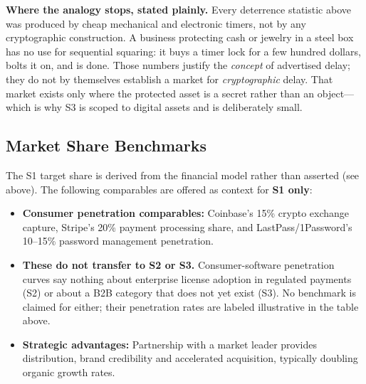 \noindent\textbf{Where the analogy stops, stated plainly.} Every deterrence statistic
above was produced by cheap mechanical and electronic timers, not by any cryptographic
construction. A business protecting cash or jewelry in a steel box has no use for
sequential squaring: it buys a timer lock for a few hundred dollars, bolts it on, and
is done. Those numbers justify the \emph{concept} of advertised delay; they do not by
themselves establish a market for \emph{cryptographic} delay. That market exists only
where the protected asset is a secret rather than an object---which is why S3 is scoped
to digital assets and is deliberately small.

\subsection{Market Share Benchmarks}
The S1 target share is derived from the financial model rather than asserted (see
above). The following comparables are offered as context for \textbf{S1 only}:

\begin{itemize}[nosep]
  \item \textbf{Consumer penetration comparables:} Coinbase's 15\% crypto exchange
    capture\cite{coinbase2021}, Stripe's 20\% payment processing
    share\cite{stripe2023}, and LastPass/1Password's 10--15\% password management
    penetration\cite{lastpass2023}.
  \item \textbf{These do not transfer to S2 or S3.} Consumer-software penetration
    curves say nothing about enterprise license adoption in regulated payments (S2)
    or about a B2B category that does not yet exist (S3). No benchmark is claimed for
    either; their penetration rates are labeled illustrative in the table above.
  \item \textbf{Strategic advantages:} Partnership with a market leader provides
    distribution, brand credibility and accelerated acquisition, typically doubling
    organic growth rates\cite{reforge2022,hagiu2015}.
\end{itemize}

